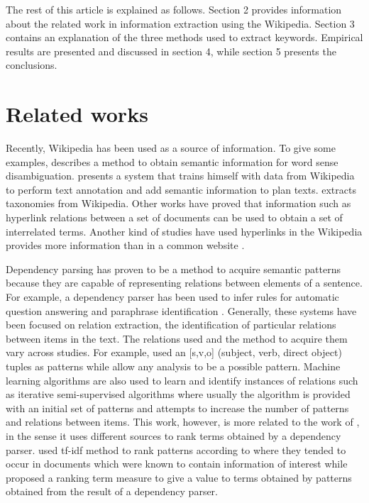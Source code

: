 \documentclass[oribibl]{llncs}
\begin{document}
The rest of this article is explained as follows. Section 2 provides information about the related work in information extraction using the Wikipedia. Section 3 contains an explanation of the three methods used to extract keywords. Empirical results are presented and discussed in section 4, while section 5 presents the conclusions.    

\section{Related works}

Recently, Wikipedia has been used as a source of information. To give some examples, \cite{Mihalce2007} describes a method to obtain semantic information for word sense disambiguation. \cite{Makris2013} presents a system that trains himself with data from Wikipedia to perform text annotation and add semantic information to plan texts. \cite{Garcia2011} extracts taxonomies from Wikipedia. Other works have proved that information such as hyperlink relations between a set of documents \cite{Davison2000} can be used to obtain a set of interrelated terms. Another kind of studies have used hyperlinks in the Wikipedia provides more information than in a common website \cite{Nakayama2007}. 

Dependency parsing has proven to be a method to acquire semantic patterns because they are capable of representing relations between elements of a sentence. For example, a dependency parser has been used to infer rules for automatic question answering \cite{Lin2001} and paraphrase identification \cite{Szpektor2004}. Generally, these systems have been focused on relation extraction, the identification of particular relations between items in the text. The relations used and the method to acquire them vary across studies. For example, \cite{Yangarber2003} used an [s,v,o] (subject, verb, direct object) tuples as patterns while \cite{Sudo2001} allow any analysis to be a possible pattern. Machine learning algorithms are also used to learn and identify instances of relations such as iterative semi-supervised algorithms \cite{Greenwood2006} where usually the algorithm is provided with an initial set of patterns and attempts to increase the number of patterns and relations between items. This work, however, is more related to the work of \cite{Sudo2001,Stevenson2009}, in the sense it uses different sources to rank terms obtained by a dependency parser. \cite{Sudo2001} used tf-idf method to rank patterns according to where they tended to occur in documents which were known to contain information of interest while \cite{Stevenson2009} proposed a ranking term measure to give a value to terms obtained by patterns obtained from the result of a dependency parser. 
 
\end{document}

